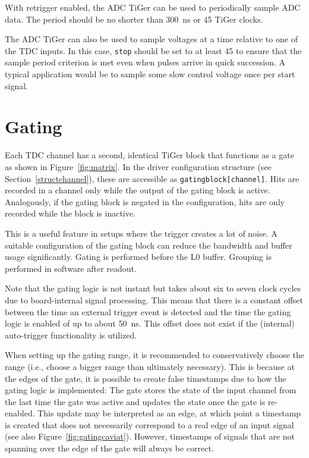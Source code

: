 {    With retrigger enabled, the ADC TiGer can be used to periodically
    sample ADC data.  The period should be no shorter than
    \SI{300}{\nano\second} or 45 TiGer clocks.

    The ADC TiGer can also be used to sample voltages at a time relative
    to one of the TDC inputs. In this case, \texttt{stop} should be set to
    at least 45 to ensure that the sample period criterion is met even
    when pulses arrive in quick succession. A typical application would be
    to sample some slow control voltage once per start signal.

    \newpage
    \label{cp:gating}
    \section{Gating}
    Each TDC channel has a second, identical TiGer block that functions as a
    gate as shown in Figure~\ref{fig:matrix}. In the driver configuration
    structure (see Section~\ref{structchannel}), these are accessible as
    \mbox{\texttt{gating\tu block[channel]}}.  Hits are recorded in a channel
    only while the output of the gating block is active. Analogously, if the 
    gating block is negated in the configuration, hits are only recorded while
    the block is inactive.
    
    This is a useful feature in setups where the trigger creates a lot of
    noise.  A suitable configuration of the gating block can reduce the
    bandwidth and buffer usage significantly.  Gating is performed before the
    L0 buffer. Grouping is performed in software after readout. 

    Note that the gating logic is not instant but takes about six to seven
    clock cycles due to board-internal signal processing. 
    This means that there is a constant offset between the time an
    external trigger event is detected and the time the gating logic is
    enabled of up to about 50~ns.
    This offset does not exist if the (internal) auto-trigger functionality
    is utilized.

    When setting up the gating range, it is recommended to conservatively 
    choose the range (i.e., choose a bigger range than ultimately necessary).
    This is because at the edges of the gate, it is possible
    to create false timestamps due to how the gating logic is implemented: 
    The gate stores the state of the input channel from the last time the
    gate was active and updates the state once the gate is re-enabled. This
    update may be interpreted as an edge, at which point a timestamp is
    created that does not necessarily correspond to a real edge of an input
    signal (see also Figure~\ref{fig:gatingcaviat}).
    However, timestamps of signals that are not spanning over the edge of the 
    gate will always be correct.

}
